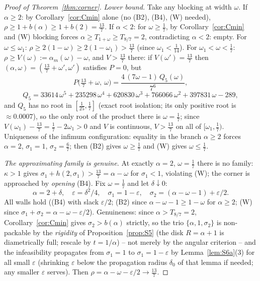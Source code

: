 \documentclass[11pt]{article}
\theoremstyle{definition}
\begin{document}
\begin{proof}[Proof of Theorem~\ref{thm:corner}]
\emph{Lower bound.} Take any blocking at width $\omega$. If $\alpha\ge2$:
by Corollary~\ref{cor:Cmin} alone (no (B2), (B4), (W) needed),
$\rho\ge1+b(\alpha)\ge1+b(2)=\tfrac{13}7$. If $\alpha<2$: for
$\omega\ge\tfrac17$, by Corollary~\ref{cor:Cmin} and (W) blocking
forces $\alpha\ge T_{1+\omega}\ge T_{8/7}=2$, contradicting $\alpha<2$:
empty.
For $\omega\le\omega_1$: $\rho\ge2(1-\omega)\ge2(1-\omega_1)>\tfrac{13}7$
(since $\omega_1<\tfrac1{14}$). For $\omega_1<\omega<\tfrac17$:
$\rho\ge V(\omega):=\alpha_m(\omega)-\omega$, and $V>\tfrac{13}7$ there:
if $V(\omega')=\tfrac{13}7$ then $(\alpha,\omega)=(\tfrac{13}7+\omega',
\omega')$ satisfies $P=0$, but
\[
P\bigl(\tfrac{13}7+\omega,\ \omega\bigr)
=\frac{4\,(7\omega-1)\,Q_5(\omega)}{7^6},
\]
\[
Q_5=33614\,\omega^5+235298\,\omega^4+620830\,\omega^3+766066\,\omega^2
+397831\,\omega-289,
\]
and $Q_5$ has no root in $[\tfrac1{25},\tfrac17]$ (exact root isolation;
its only positive root is $\approx0.0007$), so the only root of the
product there is $\omega=\tfrac17$; since
$V(\omega_1)-\tfrac{13}7=\tfrac17-2\omega_1>0$ and $V$ is continuous,
$V>\tfrac{13}7$ on all of $[\omega_1,\tfrac17)$. Uniqueness of the
infimum configuration: equality in the branch $\alpha\ge2$ forces
$\alpha=2$, $\sigma_1=1$, $\sigma_2=\tfrac67$; then (B2) gives
$\omega\ge\tfrac17$ and (W) gives $\omega\le\tfrac17$.

\emph{The approximating family is genuine.} At exactly $\alpha=2$,
$\omega=\tfrac17$ there is no family: $\kappa>1$ gives
$\sigma_1+h(2,\sigma_1)>\tfrac{13}7=\alpha-\omega$ for $\sigma_1<1$,
violating (W); the corner is approached by \emph{opening} (B4). Fix
$\omega=\tfrac17$ and let $\delta\downarrow0$:
\[
\alpha=2+\delta,\quad\varepsilon=\delta^2/4,\quad
\sigma_1=1-\varepsilon,\quad\sigma_2=(\alpha-\omega-1)+\varepsilon/2.
\]
All walls hold ((B4) with slack $\varepsilon/2$; (B2) since
$\alpha-\omega-1\ge1-\omega$ for $\alpha\ge2$; (W) since
$\sigma_1+\sigma_2=\alpha-\omega-\varepsilon/2$). Genuineness: since
$\alpha>T_{8/7}=2$, Corollary~\ref{cor:Cmin} gives
$\sigma_2>b(\alpha)$ strictly, so the trio $\{\alpha,1,\sigma_2\}$ is
non-packable by the \emph{rigidity} of Proposition~\ref{prop:S5}
(the disk $R=\alpha+1$ is diametrically full; rescale by $t=1/\alpha$) --
not merely by the angular criterion -- and the infeasibility propagates
from $\sigma_1=1$ to $\sigma_1=1-\varepsilon$ by
Lemma~\ref{lem:S6a}(3) for all small $\varepsilon$ (shrinking
$\varepsilon$ below the propagation radius $\delta_0$ of that lemma if
needed; any smaller $\varepsilon$ serves). Then
$\rho=\alpha-\omega-\varepsilon/2\to\tfrac{13}7$.
\end{proof}
\end{document}
